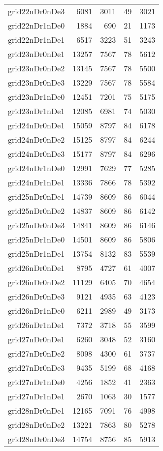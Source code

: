 \begin{longtable}{lrrrr}
grid22nDr0nDe3 & 6081 & 3011 & 49 & 3021 \\
grid22nDr1nDe0 & 1884 & 690 & 21 & 1173 \\
grid22nDr1nDe1 & 6517 & 3223 & 51 & 3243 \\
grid23nDr0nDe1 & 13257 & 7567 & 78 & 5612 \\
grid23nDr0nDe2 & 13145 & 7567 & 78 & 5500 \\
grid23nDr0nDe3 & 13229 & 7567 & 78 & 5584 \\
grid23nDr1nDe0 & 12451 & 7201 & 75 & 5175 \\
grid23nDr1nDe1 & 12085 & 6981 & 74 & 5030 \\
grid24nDr0nDe1 & 15059 & 8797 & 84 & 6178 \\
grid24nDr0nDe2 & 15125 & 8797 & 84 & 6244 \\
grid24nDr0nDe3 & 15177 & 8797 & 84 & 6296 \\
grid24nDr1nDe0 & 12991 & 7629 & 77 & 5285 \\
grid24nDr1nDe1 & 13336 & 7866 & 78 & 5392 \\
grid25nDr0nDe1 & 14739 & 8609 & 86 & 6044 \\
grid25nDr0nDe2 & 14837 & 8609 & 86 & 6142 \\
grid25nDr0nDe3 & 14841 & 8609 & 86 & 6146 \\
grid25nDr1nDe0 & 14501 & 8609 & 86 & 5806 \\
grid25nDr1nDe1 & 13754 & 8132 & 83 & 5539 \\
grid26nDr0nDe1 & 8795 & 4727 & 61 & 4007 \\
grid26nDr0nDe2 & 11129 & 6405 & 70 & 4654 \\
grid26nDr0nDe3 & 9121 & 4935 & 63 & 4123 \\
grid26nDr1nDe0 & 6211 & 2989 & 49 & 3173 \\
grid26nDr1nDe1 & 7372 & 3718 & 55 & 3599 \\
grid27nDr0nDe1 & 6260 & 3048 & 52 & 3160 \\
grid27nDr0nDe2 & 8098 & 4300 & 61 & 3737 \\
grid27nDr0nDe3 & 9435 & 5199 & 68 & 4168 \\
grid27nDr1nDe0 & 4256 & 1852 & 41 & 2363 \\
grid27nDr1nDe1 & 2670 & 1063 & 30 & 1577 \\
grid28nDr0nDe1 & 12165 & 7091 & 76 & 4998 \\
grid28nDr0nDe2 & 13221 & 7863 & 80 & 5278 \\
grid28nDr0nDe3 & 14754 & 8756 & 85 & 5913 \\

\end{longtable}
